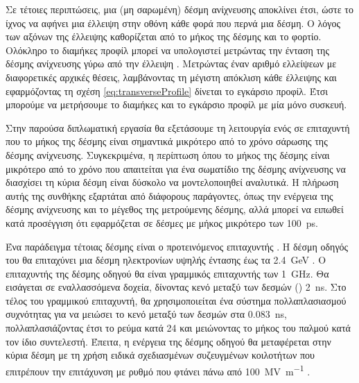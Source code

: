 Σε τέτοιες περιπτώσεις, μια (μη σαρωμένη) δέσμη ανίχνευσης αποκλίνει έτσι, ώστε το ίχνος να αφήνει μια έλλειψη στην οθόνη κάθε φορά που περνά μια δέσμη.
Ο λόγος των αξόνων της έλλειψης καθορίζεται από το μήκος της δέσμης και το φορτίο.
Ολόκληρο το διαμήκες προφίλ μπορεί να υπολογιστεί μετρώντας την ένταση της δέσμης ανίχνευσης γύρω από την έλλειψη \cite{Logatchov1999}.
Μετρώντας έναν αριθμό ελλείψεων με διαφορετικές αρχικές θέσεις, λαμβάνοντας τη μέγιστη απόκλιση κάθε έλλειψης και εφαρμόζοντας τη σχέση \ref{eq:transverseProfile} δίνεται το εγκάρσιο προφίλ.
Έτσι μπορούμε να μετρήσουμε το διαμήκες και το εγκάρσιο προφίλ με μία μόνο συσκευή.

Στην παρούσα διπλωματική εργασία θα εξετάσουμε τη λειτουργία ενός  σε επιταχυντή που το μήκος της δέσμης είναι σημαντικά μικρότερο από το χρόνο σάρωσης της δέσμης ανίχνευσης. 
Συγκεκριμένα, η περίπτωση όπου το μήκος της δέσμης είναι μικρότερο από το χρόνο που απαιτείται για ένα σωματίδιο της δέσμης ανίχνευσης να διασχίσει τη κύρια δέσμη είναι δύσκολο να μοντελοποιηθεί αναλυτικά. 
Η πλήρωση αυτής της συνθήκης εξαρτάται από διάφορους παράγοντες, όπως την ενέργεια της δέσμης ανίχνευσης και το μέγεθος της μετρούμενης δέσμης, αλλά μπορεί να ειπωθεί κατά προσέγγιση ότι εφαρμόζεται σε δέσμες με μήκος μικρότερο των \SI{100}{\pico \second}.

Ένα παράδειγμα τέτοιας δέσμης είναι ο προτεινόμενος επιταχυντής . 
Η δέσμη οδηγός του  θα επιταχύνει μια δέσμη ηλεκτρονίων υψηλής έντασης έως τα \SI{2.4}{\giga \electronvolt} \cite{Aicheler2012}.
Ο επιταχυντής της δέσμης οδηγού θα είναι γραμμικός επιταχυντής των \SI{1}{\giga \hertz}.
Θα εισάγεται σε εναλλασσόμενα δοχεία, δίνοντας κενό μεταξύ των δεσμών () \SI{2}{\nano \second}.
Στο τέλος του γραμμικού επιταχυντή, θα χρησιμοποιείται ένα σύστημα πολλαπλασιασμού συχνότητας \cite{Biscari2009} για να μειώσει το κενό μεταξύ των δεσμών στα \SI{0.083}{\nano \second}, πολλαπλασιάζοντας έτσι το ρεύμα κατά \num{24} και μειώνοντας το μήκος του παλμού κατά τον ίδιο συντελεστή.
Έπειτα, η ενέργεια της δέσμης οδηγού θα μεταφέρεται στην κύρια δέσμη με τη χρήση ειδικά σχεδιασμένων συζευγμένων κοιλοτήτων που επιτρέπουν την επιτάχυνση με ρυθμό που φτάνει πάνω από \SI[per-mode = symbol]{100}{\mega \volt \per \meter} \cite{Degiovanni2014}.

